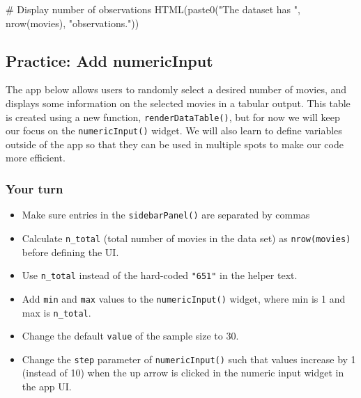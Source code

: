 \documentclass[
  letterpaper,
  DIV=11,
  numbers=noendperiod]{scrreprt}
\newenvironment{Shaded}{\begin{snugshade}}{\end{snugshade}}
\newcommand{\CommentTok}[1]{\textcolor[rgb]{0.37,0.37,0.37}{#1}}
\newcommand{\FunctionTok}[1]{\textcolor[rgb]{0.28,0.35,0.67}{#1}}
\newcommand{\NormalTok}[1]{\textcolor[rgb]{0.00,0.46,0.62}{#1}}
\newcommand{\StringTok}[1]{\textcolor[rgb]{0.13,0.47,0.30}{#1}}
\begin{document}
\begin{Shaded}
\begin{Highlighting}[]
\CommentTok{\# Display number of observations}
\FunctionTok{HTML}\NormalTok{(}\FunctionTok{paste0}\NormalTok{(}\StringTok{"The dataset has "}\NormalTok{, }\FunctionTok{nrow}\NormalTok{(movies), }
            \StringTok{"observations."}\NormalTok{))}
\end{Highlighting}
\end{Shaded}

\hypertarget{practice-add-numericinput}{%
\subsection{Practice: Add
numericInput}\label{practice-add-numericinput}}

The app below allows users to randomly select a desired number of
movies, and displays some information on the selected movies in a
tabular output. This table is created using a new function,
\texttt{renderDataTable()}, but for now we will keep our focus on the
\texttt{numericInput()} widget. We will also learn to define variables
outside of the app so that they can be used in multiple spots to make
our code more efficient.

\hypertarget{your-turn-6}{%
\subsubsection{Your turn}\label{your-turn-6}}

\begin{itemize}
\item
  Make sure entries in the \texttt{sidebarPanel()} are separated by
  commas
\item
  Calculate \texttt{n\_total} (total number of movies in the data set)
  as \texttt{nrow(movies)} before defining the UI.
\item
  Use \texttt{n\_total} instead of the hard-coded \texttt{"651"} in the
  helper text.
\item
  Add \texttt{min} and \texttt{max} values to the
  \texttt{numericInput()} widget, where min is 1 and max is
  \texttt{n\_total}.
\item
  Change the default \texttt{value} of the sample size to 30.
\item
  Change the \texttt{step} parameter of \texttt{numericInput()} such
  that values increase by 1 (instead of 10) when the up arrow is clicked
  in the numeric input widget in the app UI.
\end{itemize}
\end{document}
